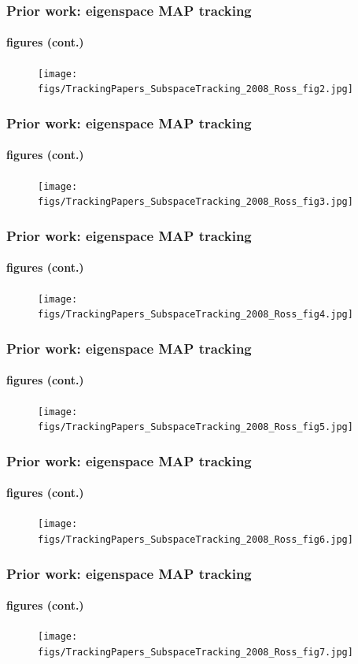 \begin{frame}
\frametitle{Prior work: eigenspace MAP tracking}
\framesubtitle{figures (cont.)}
\logoCSIPCPL\mypagenum
	\begin{figure}
		\texttt{[image: figs/TrackingPapers\_SubspaceTracking\_2008\_Ross\_fig2.jpg]}
	\end{figure}
\end{frame}


\begin{frame}
\frametitle{Prior work: eigenspace MAP tracking}
\framesubtitle{figures (cont.)}
\logoCSIPCPL\mypagenum
	\begin{figure}
		\texttt{[image: figs/TrackingPapers\_SubspaceTracking\_2008\_Ross\_fig3.jpg]}
	\end{figure}
\end{frame}


\begin{frame}
\frametitle{Prior work: eigenspace MAP tracking}
\framesubtitle{figures (cont.)}
\logoCSIPCPL\mypagenum
	\begin{figure}
		\texttt{[image: figs/TrackingPapers\_SubspaceTracking\_2008\_Ross\_fig4.jpg]}
	\end{figure}
\end{frame}



\begin{frame}
\frametitle{Prior work: eigenspace MAP tracking}
\framesubtitle{figures (cont.)}
\logoCSIPCPL\mypagenum
	\begin{figure}
		\texttt{[image: figs/TrackingPapers\_SubspaceTracking\_2008\_Ross\_fig5.jpg]}
	\end{figure}
\end{frame}



\begin{frame}
\frametitle{Prior work: eigenspace MAP tracking}
\framesubtitle{figures (cont.)}
\logoCSIPCPL\mypagenum
	\begin{figure}
		\texttt{[image: figs/TrackingPapers\_SubspaceTracking\_2008\_Ross\_fig6.jpg]}
	\end{figure}
\end{frame}



\begin{frame}
\frametitle{Prior work: eigenspace MAP tracking}
\framesubtitle{figures (cont.)}
\logoCSIPCPL\mypagenum
	\begin{figure}
		\texttt{[image: figs/TrackingPapers\_SubspaceTracking\_2008\_Ross\_fig7.jpg]}
	\end{figure}
\end{frame}


